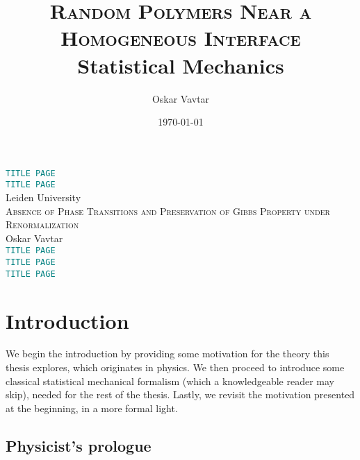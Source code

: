 \documentclass[12pt]{article}
\title{\textsc{Random Polymers Near a Homogeneous Interface}\\\vspace{0.3cm}\small{Statistical Mechanics}\vspace{-0.7cm}}
\author{Oskar Vavtar}
\date{\today}
\newcommand{\1}{\mathbbm{1}}
\newcommand{\5}{\vspace{0.5cm}}
\theoremstyle{definition}
\begin{document}
\begin{center}
\Huge{\textcolor{teal}{\texttt{TITLE PAGE}}} \\
\vspace{2cm}
\Huge{\textcolor{teal}{\texttt{TITLE PAGE}}} \\
\vspace{2cm}
Leiden University \\
\vspace{2cm}
{\textsc{Absence of Phase Transitions and Preservation of Gibbs Property under Renormalization}} \\
\vspace{2cm}
Oskar Vavtar \\
\vspace{2cm}
\Huge{\textcolor{teal}{\texttt{TITLE PAGE}}} \\
\vspace{2cm}
\Huge{\textcolor{teal}{\texttt{TITLE PAGE}}} \\
\vspace{2cm}
\Huge{\textcolor{teal}{\texttt{TITLE PAGE}}}
\end{center}
\pagebreak
\tableofcontents
\pagebreak


\section{Introduction}\label{ch:1}

We begin the introduction by providing some motivation for the theory this thesis explores, which originates in physics. We then proceed to introduce some classical statistical mechanical formalism (which a knowledgeable reader may skip), needed for the rest of the thesis. Lastly, we revisit the motivation presented at the beginning, in a more formal light.


\subsection{Physicist's prologue}
\end{document}
